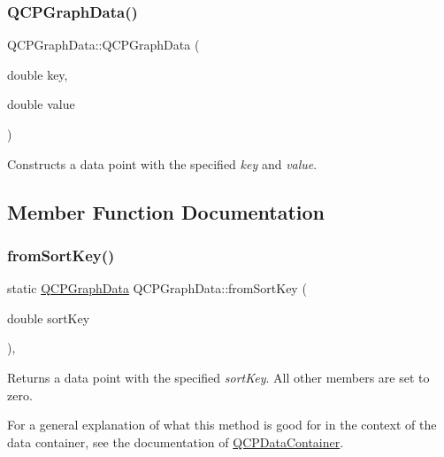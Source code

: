 \subsubsection{\texorpdfstring{Q\+C\+P\+Graph\+Data()}{QCPGraphData()}\hspace{0.1cm}{\footnotesize\ttfamily [2/2]}}
{\footnotesize\ttfamily Q\+C\+P\+Graph\+Data\+::\+Q\+C\+P\+Graph\+Data (\begin{DoxyParamCaption}\item[{double}]{key,  }\item[{double}]{value }\end{DoxyParamCaption})}

Constructs a data point with the specified {\itshape key} and {\itshape value}. 

\subsection{Member Function Documentation}
\mbox{\label{class_q_c_p_graph_data_a4646eac7f7a48970ea0fc5153aab0e77}} 
\subsubsection{\texorpdfstring{from\+Sort\+Key()}{fromSortKey()}}
{\footnotesize\ttfamily static \hyperlink{class_q_c_p_graph_data}{Q\+C\+P\+Graph\+Data} Q\+C\+P\+Graph\+Data\+::from\+Sort\+Key (\begin{DoxyParamCaption}\item[{double}]{sort\+Key }\end{DoxyParamCaption})\hspace{0.3cm}{\ttfamily [inline]}, {\ttfamily [static]}}

Returns a data point with the specified {\itshape sort\+Key}. All other members are set to zero.

For a general explanation of what this method is good for in the context of the data container, see the documentation of \hyperlink{class_q_c_p_data_container}{Q\+C\+P\+Data\+Container}. \mbox{\label{class_q_c_p_graph_data_a72fdaf738f679ef93bea3d552ba42d1b}} 
